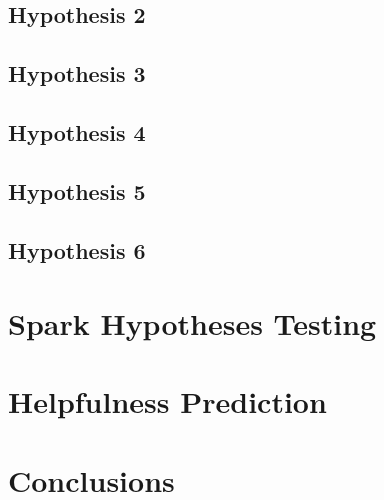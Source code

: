 \documentclass{class}
\begin{document}
\begin{multicols}{2}
    \subsection*{Hypothesis 2}
    \subsection*{Hypothesis 3}
    \subsection*{Hypothesis 4}
    \subsection*{Hypothesis 5}
    \subsection*{Hypothesis 6}
    \section{Spark Hypotheses Testing}
    \section{Helpfulness Prediction}
    \section{Conclusions}

\end{multicols}
\end{document}
